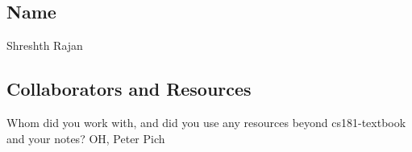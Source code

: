 \documentclass[submit]{harvardml}
\begin{document}
\newpage


\subsection*{Name} Shreshth Rajan 

\subsection*{Collaborators and Resources}
Whom did you work with, and did you use any resources beyond cs181-textbook and your notes? OH, Peter Pich 
\end{document}
